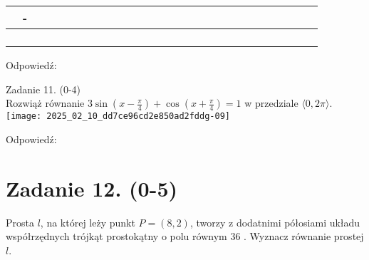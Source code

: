 \documentclass[10pt]{article}
\begin{document}
\begin{center}
\begin{tabular}{|c|c|c|c|c|c|c|c|c|c|c|c|c|c|c|c|c|c|c|c|c|c|c|c|c|c|c|}
\hline
 & - &  &  &  &  &  &  &  &  &  &  &  &  &  &  &  &  &  &  &  &  &  &  &  &  &  \\
\hline
 &  &  &  &  &  &  &  &  &  &  &  &  &  &  &  &  &  &  &  &  &  &  &  &  &  &  \\
\hline
 &  &  &  &  &  &  &  &  &  &  &  &  &  &  &  &  &  &  &  &  &  &  &  &  &  &  \\
\hline
 &  &  &  &  &  &  &  &  &  &  &  &  &  &  &  &  &  &  &  &  &  &  &  &  &  &  \\
\hline
 &  &  &  &  &  &  &  &  &  &  &  &  &  &  &  &  &  &  &  &  &  &  &  &  &  &  \\
\hline
\end{tabular}
\end{center}

Odpowiedź: \(\qquad\)

Zadanie 11. (0-4)\\
Rozwiąż równanie \(3 \sin \left(x-\frac{\pi}{4}\right)+\cos \left(x+\frac{\pi}{4}\right)=1\) w przedziale \(\langle 0,2 \pi\rangle\).\\
\texttt{[image: 2025\_02\_10\_dd7ce96cd2e850ad2fddg-09]}

Odpowiedź:

\section*{Zadanie 12. (0-5)}
Prosta \(l\), na której leży punkt \(P=(8,2)\), tworzy z dodatnimi półosiami układu współrzędnych trójkąt prostokątny o polu równym 36 . Wyznacz równanie prostej \(l\).
\end{document}
